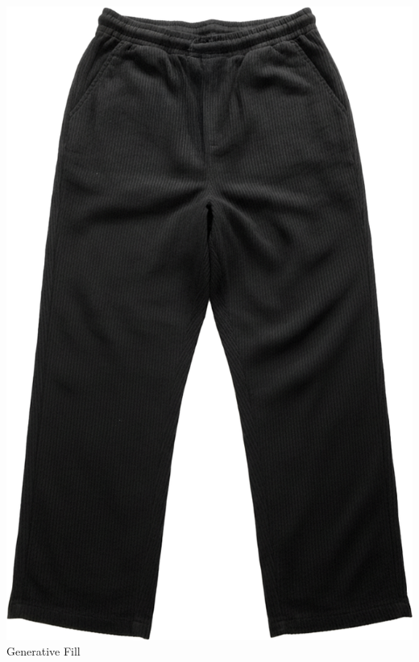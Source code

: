 \documentclass[10pt]{article}
\begin{document}
\begin{minipage}[t]{0.22\textwidth}\centering\vspace{0mm}
\includegraphics[width=\linewidth,keepaspectratio]{assets/pants/Generative Fill.png}\\
\vspace{0.5mm}\tiny Generative Fill\end{minipage}
\
\vspace{2mm}\
\end{document}
